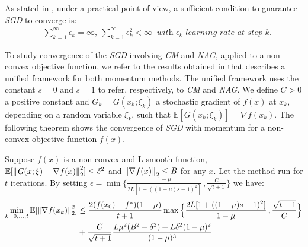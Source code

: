 As stated in \parencite[Chap. 8]{bengio}, under a practical point of view, a sufficient condition to guarantee \textit{SGD} to converge is:
\begin{align*}
    & \sum_{k=1}^\infty\epsilon_k=\infty,\ \sum_{k=1}^\infty\epsilon_k^2<\infty\ \textit{ with $\epsilon_k$ learning rate at step k.}
\end{align*}

To study convergence of the \textit{SGD} involving \textit{CM} and \textit{NAG}, applied to a non-convex objective function, we refer to the results obtained in \cite{sgdunified} that describes a unified framework for both momentum methods. The unified framework uses the constant $s=0$ and $s=1$ to refer, respectively, to \textit{CM} and \textit{NAG}. We define $C>0$ a positive constant and $\mathit{G}_k = \mathit{G}(x_k; \xi_k)$ a stochastic gradient  of $f(x)$ at $x_k$, depending on a random variable $\xi_k$, such that ${\mathbb{E}[\mathit{G}(x_k;\xi_k)] = \nabla f(x_k)}$. The following theorem shows the convergence of \textit{SGD} with momentum for a non-convex objective function $f(x)$.

\begin{thm}
\label{thm:convmom}
Suppose $f(x)$ is a non-convex and L-smooth function, ${\mathbb{E}[\left\lVert \mathit{G}(x;\xi)-\nabla f(x) \right\rVert_2^2]\leq\delta^2}$ and $\left\lVert \nabla f(x) \right\rVert_2\leq\mathit{B}$ for any $x$. Let the method run for $t$ iterations. By setting $\epsilon = \min\{\frac{1-\mu}{2L[1+((1-\mu)s-1)^2]}\,,\frac{C}{\sqrt{t+1}}\}$ we have:
\begin{align*}
    \min_{k=0,...,t}\mathbb{E}[\left\lVert \nabla f(x_k) \right\rVert_2^2] &\leq \frac{2(f(x_0)-f^*)(1-\mu)}{t+1}\max\Big\{\frac{2L[1+((1-\mu)s-1)^2]}{1-\mu}\,,\frac{\sqrt{t+1}}{C}\Big\}\\
    &+\frac{C}{\sqrt{t+1}}\frac{L\mu^2(\mathit{B}^2+\delta^2)+L\delta^2(1-\mu)^2}{(1-\mu)^3}
\end{align*}
\end{thm}


